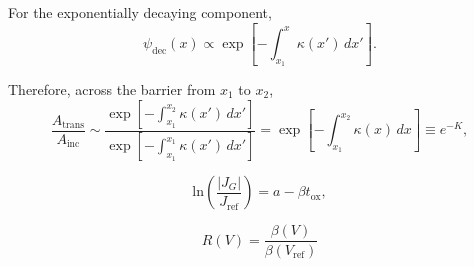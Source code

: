 \documentclass[12pt]{article}
\begin{document}
For the exponentially decaying component,
\begin{equation}
\psi_{\mathrm{dec}}(x)
\propto
\exp\left[-\int_{x_1}^{x}\kappa(x')\,dx'\right].
\end{equation}

Therefore, across the barrier from $x_1$ to $x_2$,
\begin{equation}
\frac{A_{\mathrm{trans}}}{A_{\mathrm{inc}}}
\sim
\frac{
\exp\left[-\int_{x_1}^{x_2}\kappa(x')\,dx'\right]
}{
\exp\left[-\int_{x_1}^{x_1}\kappa(x')\,dx'\right]
}
=
\exp\left[-\int_{x_1}^{x_2}\kappa(x)\,dx\right]
\equiv e^{-K},
\end{equation}

\begin{equation}
    \mathrm{ln}\left(\frac{|J_G|}{J_{\mathrm{ref}}}\right)=a-\beta{t}_{\mathrm{ox}},
    \label{eq:experimental-linear-fit}
\end{equation}

\[R(V) = \frac{\beta(V)}{\beta(V_{\mathrm{ref}})}\]
\newpage
{}

\end{document}
